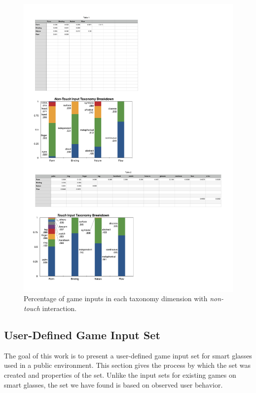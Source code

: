 \documentclass{sigchi}
\begin{document}
  \begin{figure}[!h]
  \centering
  \includegraphics[width=1\columnwidth]{InAirTaxonomy.pdf}
  \caption{Percentage of game inputs in each taxonomy dimension with \emph{non-touch} interaction.}
  \label{fig:InAirTaxonomy}
  \end{figure} 

  \subsection{User-Defined Game Input Set}
  The goal of this work is to present a user-defined game input set for smart glasses used in a public environment. This section gives the process by which the set was created and properties of the set. Unlike the input sets for existing games on smart glasses, the set we have found is based on observed user behavior.
\end{document}
